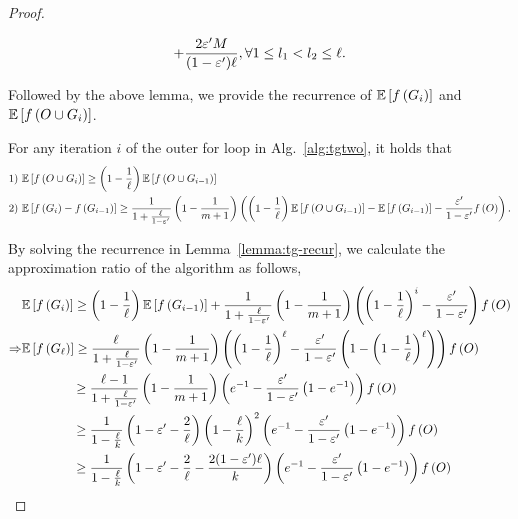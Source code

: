 \begin{proof}
\begin{lemma}
\begin{align*}
+\frac{2\varepsilon' M}{(1-\varepsilon')\ell}, \forall 1\le l_1 < l_2 \le \ell.
\end{align*}
\end{lemma}
Followed by the above lemma, 
we provide the recurrence of $\mathbb{E}\left[ f \left( G_i \right) \right]$ and $\mathbb{E}\left[ f \left( O\cup G_i \right) \right]$.
\begin{lemma}\label{lemma:tg-recur}
For any iteration $i$ of the outer for loop in Alg.~\ref{alg:tgtwo},
it holds that
\begin{align*}
\text{1) } & \mathbb{E}\left[ f \left( O\cup G_i \right) \right]\ge \left(1-\frac{1}{\ell}\right) \mathbb{E}\left[ f \left( O\cup G_{i-1} \right) \right]\\
\text{2) } & \mathbb{E}\left[ f \left( G_i \right) - f \left( G_{i-1} \right) \right]
\ge\frac{1}{1+\frac{\ell}{1-\varepsilon'}}\left(1-\frac{1}{m+1}\right)\left(\left(1-\frac{1}{\ell}\right)  \mathbb{E}\left[ f \left( O\cup G_{i-1} \right) \right] - \mathbb{E}\left[ f \left( G_{i-1} \right) \right] - \frac{\varepsilon'}{1-\varepsilon'}f \left( O \right)\right).
\end{align*}
\end{lemma}
By solving the recurrence in Lemma~\ref{lemma:tg-recur},
we calculate the approximation ratio of the algorithm as follows,
\begin{align*}
&\ex{\ff{G_{i}}}  \ge \left(1-\frac{1}{\ell}\right) \ex{\ff{G_{i-1}}}
+ \frac{1}{1+\frac{\ell}{1-\epsi'}}\left(1-\frac{1}{m+1}\right)\left(\left(1-\frac{1}{\ell}\right)^i - \frac{\epsi'}{1-\epsi'}\right)\ff{O}\\
\Rightarrow& \ex{\ff{G_\ell}} \ge \frac{\ell}{1+\frac{\ell}{1-\epsi'}}\left(1-\frac{1}{m+1}\right)\left(\left(1-\frac{1}{\ell}\right)^\ell - \frac{\epsi'}{1-\epsi'}\left(1-\left(1-\frac{1}{\ell}\right)^\ell\right)\right)\ff{O}\\
&\hspace*{4em} \ge \frac{\ell-1}{1+\frac{\ell}{1-\epsi'}}\left(1-\frac{1}{m+1}\right)\left(e^{-1} - \frac{\epsi'}{1-\epsi'}\left(1-e^{-1}\right)\right)\ff{O}\\
&\hspace*{4em} \ge \frac{1}{1-\frac{\ell}{k}}\left(1-\epsi' - \frac{2}{\ell}\right)\left(1-\frac{\ell}{k}\right)^2\left(e^{-1} - \frac{\epsi'}{1-\epsi'}\left(1-e^{-1}\right)\right) \ff{O}\\
&\hspace*{4em} \ge \frac{1}{1-\frac{\ell}{k}}\left(1-\epsi' - \frac{2}{\ell}-\frac{2(1-\epsi')\ell}{k}\right)\left(e^{-1} - \frac{\epsi'}{1-\epsi'}\left(1-e^{-1}\right)\right) \ff{O}\\

\end{align*}
\end{proof}
